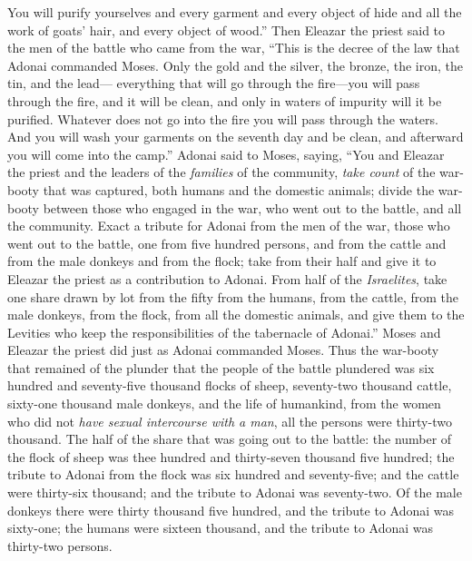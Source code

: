\begin{biblechapter}
\verse You will purify yourselves and every garment and every object of hide and all the work of goats’ hair, and every object of wood.”
\verse Then Eleazar the priest said to the men of the battle who came from the war, “This is the decree of the law that Adonai commanded Moses.
\verse Only the gold and the silver, the bronze, the iron, the tin, and the lead—
\verse everything that will go through the fire—you will pass through the fire, and it will be clean, and only in waters of impurity will it be purified. Whatever does not go into the fire you will pass through the waters.
\verse And you will wash your garments on the seventh day and be clean, and afterward you will come into the camp.”
 Adonai said to Moses, saying,
\verse “You and Eleazar the priest and the leaders of the \textit{families} of the community, \textit{take count} of the war-booty that was captured, both humans and the domestic animals;
\verse divide the war-booty between those who engaged in the war, who went out to the battle, and all the community.
\verse Exact a tribute for Adonai from the men of the war, those who went out to the battle, one from five hundred persons, and from the cattle and from the male donkeys and from the flock;
\verse take from their half and give it to Eleazar the priest as a contribution to Adonai.
\verse From half of the \textit{Israelites}, take one share drawn by lot from the fifty from the humans, from the cattle, from the male donkeys, from the flock, from all the domestic animals, and give them to the Levities who keep the responsibilities of the tabernacle of Adonai.”
\verse Moses and Eleazar the priest did just as Adonai commanded Moses.
\verse Thus the war-booty that remained of the plunder that the people of the battle plundered was six hundred and seventy-five thousand flocks of sheep,
\verse seventy-two thousand cattle,
\verse sixty-one thousand male donkeys,
\verse and the life of humankind, from the women who did not \textit{have sexual intercourse with a man}, all the persons were thirty-two thousand.
\verse The half of the share that was going out to the battle: the number of the flock of sheep was thee hundred and thirty-seven thousand five hundred;
\verse the tribute to Adonai from the flock was six hundred and seventy-five;
\verse and the cattle were thirty-six thousand; and the tribute to Adonai was seventy-two.
\verse Of the male donkeys there were thirty thousand five hundred, and the tribute to Adonai was sixty-one;
\verse the humans were sixteen thousand, and the tribute to Adonai was thirty-two persons.

\end{biblechapter}

